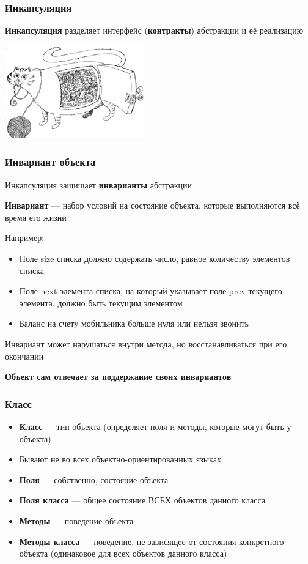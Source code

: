 \documentclass{../../slides-style}
\begin{document}
    \begin{frame}
        \frametitle{Инкапсуляция}
        \textbf{Инкапсуляция} разделяет интерфейс (\textbf{контракты}) абстракции и её реализацию

        \vskip 1cm
        \begin{center}
            \includegraphics[width=0.45\textwidth]{incapsulation.png}
        \end{center}
    \end{frame}

    \begin{frame}
        \frametitle{Инвариант объекта}
        Инкапсуляция защищает \textbf{инварианты} абстракции
        
        \textbf{Инвариант} --- набор условий на состояние объекта, которые выполняются всё время его жизни

        Например:
        \begin{itemize}
            \item Поле size списка должно содержать число, равное количеству элементов списка
            \item Поле next элемента списка, на который указывает поле prev текущего элемента, должно быть текущим элементом
            \item Баланс на счету мобильника больше нуля или нельзя звонить
        \end{itemize}

        Инвариант может нарушаться внутри метода, но восстанавливаться при его окончании

        \textbf{Объект сам отвечает за поддержание своих инвариантов}
    \end{frame}

    \begin{frame}
        \frametitle{Класс}
        \begin{itemize}
            \item \textbf{Класс} --- тип объекта (определяет поля и методы, которые могут быть у объекта)
            \item Бывают не во всех объектно-ориентированных языках 
            \item \textbf{Поля} --- собственно, состояние объекта
            \item \textbf{Поля класса} --- общее состояние ВСЕХ объектов данного класса
            \item \textbf{Методы} --- поведение объекта
            \item \textbf{Методы класса} --- поведение, не зависящее от состояния конкретного объекта (одинаковое для всех объектов данного класса)
        \end{itemize}
    \end{frame}
\end{document}
